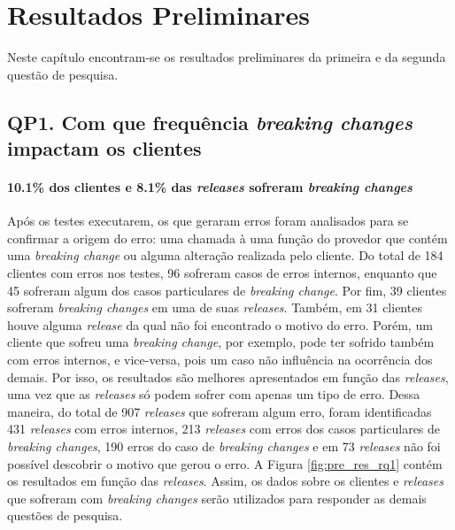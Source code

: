 \chapter{Resultados Preliminares}
\label{cap:res_pre}

Neste capítulo encontram-se os resultados preliminares da primeira e da segunda questão de pesquisa.

\section{QP1. Com que frequência \textit{breaking changes} impactam os clientes}
\label{res:qp1}

\subsubsection{\textbf{10.1\% dos clientes e 8.1\% das \textit{releases} sofreram \textit{breaking changes}}}

Após os testes executarem, os que geraram erros foram analisados para se confirmar a origem do erro: uma chamada à uma função do provedor que contém uma \textit{breaking change} ou alguma alteração realizada pelo cliente. Do total de 184 clientes com erros nos testes, 96 sofreram casos de erros internos, enquanto que 45 sofreram algum dos casos particulares de \textit{breaking change}. Por fim, 39 clientes sofreram \textit{breaking changes} em uma de suas \textit{releases}. Também, em 31 clientes houve alguma \textit{release} da qual não foi encontrado o motivo do erro. Porém, um cliente que sofreu uma \textit{breaking change}, por exemplo, pode ter sofrido também com erros internos, e vice-versa, pois um caso não influência na ocorrência dos demais. Por isso, os resultados são melhores apresentados em função das \textit{releases}, uma vez que as \textit{releases} só podem sofrer com apenas um tipo de erro. Dessa maneira, do total de 907 \textit{releases} que sofreram algum erro, foram identificadas 431 \textit{releases} com erros internos, 213 \textit{releases} com erros dos casos particulares de \textit{breaking changes}, 190 erros do caso de \textit{breaking changes} e em 73 \textit{releases} não foi possível descobrir o motivo que gerou o erro. A Figura \ref{fig:pre_res_rq1} contém os resultados em função das \textit{releases}. Assim, os dados sobre os clientes e \textit{releases} que sofreram com \textit{breaking changes} serão utilizados para responder as demais questões de pesquisa.

